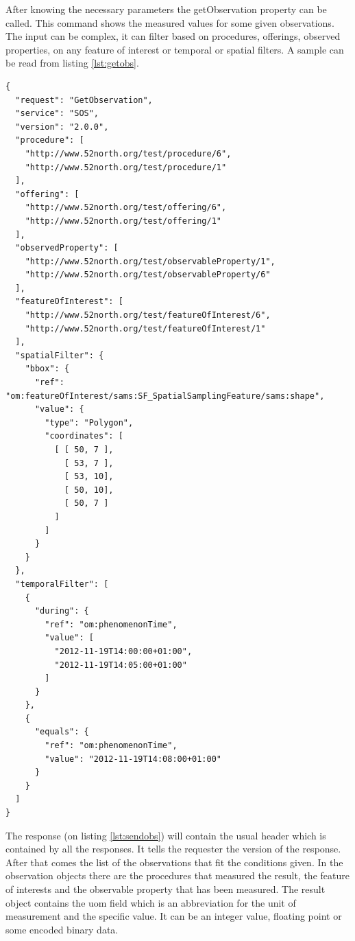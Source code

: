 After knowing the necessary parameters the getObservation property can be called. This command shows the measured values for some given observations. The input can be complex, it can filter based on procedures, offerings, observed properties, on any feature of interest or temporal or spatial filters. A sample can be read from listing \ref{lst:getobs}.

\begin{lstlisting}[caption={JSON GetObservation POST request with all filters\label{lst:getobs}}]
{
  "request": "GetObservation",
  "service": "SOS",
  "version": "2.0.0",
  "procedure": [
    "http://www.52north.org/test/procedure/6",
    "http://www.52north.org/test/procedure/1"
  ],
  "offering": [
    "http://www.52north.org/test/offering/6",
    "http://www.52north.org/test/offering/1"
  ],
  "observedProperty": [
    "http://www.52north.org/test/observableProperty/1",
    "http://www.52north.org/test/observableProperty/6"
  ],
  "featureOfInterest": [
    "http://www.52north.org/test/featureOfInterest/6",
    "http://www.52north.org/test/featureOfInterest/1"
  ],
  "spatialFilter": {
    "bbox": {
      "ref": "om:featureOfInterest/sams:SF_SpatialSamplingFeature/sams:shape",
      "value": {
        "type": "Polygon",
        "coordinates": [
          [ [ 50, 7 ],
            [ 53, 7 ],
            [ 53, 10],
            [ 50, 10],
            [ 50, 7 ]
          ]
        ]
      }
    }
  },
  "temporalFilter": [
    {
      "during": {
        "ref": "om:phenomenonTime",
        "value": [
          "2012-11-19T14:00:00+01:00",
          "2012-11-19T14:05:00+01:00"
        ]
      }
    },
    { 
      "equals": {
        "ref": "om:phenomenonTime",
        "value": "2012-11-19T14:08:00+01:00"
      }
    }
  ]
}
\end{lstlisting}

The response (on listing \ref{lst:sendobs}) will contain the usual header which is contained by all the responses. It tells the requester the version of the response. After that comes the list of the observations that fit the conditions given. In the observation objects there are the procedures that measured the result, the feature of interests and the observable property that has been measured. The result object contains the uom field which is an abbreviation for the unit of measurement and the specific value. It can be an integer value, floating point or some encoded binary data.

